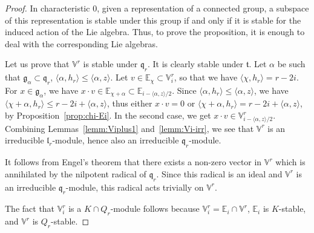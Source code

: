 \documentclass[JEP,XML,SOM,Unicode,NoFloatCountersInSection]{cedram}
\theoremstyle{plain}
\theoremstyle{definition}
\let\rgy r
\newcommand{\bE}{\mathbb{E}}
\newcommand{\Vr}{\mathbb{V}^\rgy}
\newcommand{\fgg}{\mathfrak{g}}
\newcommand{\fl}{\mathfrak{l}}
\newcommand{\fq}{\mathfrak{q}}
\newcommand{\ft}{\mathfrak{t}}
\newcommand{\scal}[1]{\langle #1 \rangle}
\begin{document}
\begin{proof}
In characteristic $0$, given a representation of a connected group, a subspace of this representation
is stable under this group if and only if it is stable for the induced action of the Lie
algebra. Thus, to prove the proposition, it is enough to deal with the corresponding Lie algebras.

Let us prove that $\Vr$ is stable under $\fq_\rgy$. It is clearly stable under $\ft$.
Let $\alpha$ be such that $\fgg_\alpha\subset\fq_\rgy$, \ie $\scal{\alpha,h_\rgy} \leq \scal{\alpha,z}$.
Let $v \in \bE_\chi \subset \Vr_i$, so that we have $\scal{\chi,h_\rgy} = \rgy-2i$.
For $x \in \fgg_\alpha$, we have $x \cdot v \in \bE_{\chi+\alpha} \subset \bE_{i-\scal{\alpha,z}/2}$. Since
$\scal{\alpha,h_\rgy} \leq \scal{\alpha,z}$, we have $\scal{\chi + \alpha, h_\rgy} \leq \rgy-2i+\scal{\alpha,z}$,
thus either $x \cdot v = 0$ or $\scal{\chi + \alpha, h_\rgy} = \rgy-2i+\scal{\alpha,z}$, by
Proposition~\ref{prop:chi-Ei}. In the second case, we get $x \cdot v \in \Vr_{i-\scal{\alpha,z}/2}$.
Combining Lemmas~\ref{lemm:Viplus1} and~\ref{lemm:Vi-irr}, we see that $\Vr$ is an irreducible
$\fl_\rgy$-module, hence also an irreducible $\fq_\rgy$\nobreakdash-module.

It follows from Engel's theorem that there exists a non-zero vector in $\Vr$ which is annihilated by the
nilpotent radical of $\fq_\rgy$. Since this radical is an ideal and $\Vr$ is an irreducible $\fq_\rgy$-module,
this radical acts trivially on $\Vr$.

The fact that $\Vr_i$ is a $K\cap Q_\rgy$-module follows because $\Vr_i = \bE_i \cap \Vr$, $\bE_i$ is $K$-stable, and
$\Vr$ is $Q_\rgy$-stable.


\end{proof}
\end{document}
